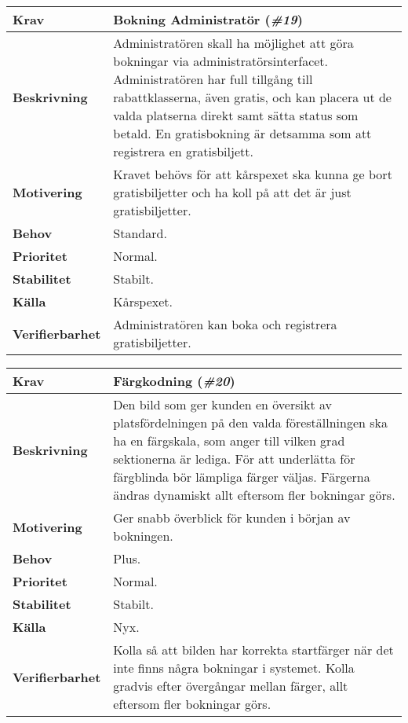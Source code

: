 \documentclass[a4paper, twoside, 11pt, titlepage]{article}
\begin{document}
		\begin{tabular} { p{2.6cm} p{12.5cm} }
			\hline
			\sffamily\textbf{Krav} & Bokning Administratör (\emph{\#19})  \\
			\hline
			\sffamily\textbf{Beskrivning} & Administratören skall ha möjlighet att göra bokningar via administratörsinterfacet. Administratören har full tillgång till rabattklasserna, även gratis, och kan placera ut de valda platserna direkt samt sätta status som betald. En gratisbokning är detsamma som att registrera en gratisbiljett.  \\
			\hline
			\sffamily\textbf{Motivering} & Kravet behövs för att kårspexet ska kunna ge bort gratisbiljetter och ha koll på att det är just gratisbiljetter.  \\
			\hline
			\sffamily\textbf{Behov} & Standard.  \\
			\hline
			\sffamily\textbf{Prioritet} & Normal.  \\
			\hline
			\sffamily\textbf{Stabilitet} & Stabilt.  \\
			\hline
			\sffamily\textbf{Källa} & Kårspexet.  \\
			\hline
			\sffamily\textbf{Verifierbarhet} & Administratören kan boka och registrera gratisbiljetter.  \\
			\hline
		\end{tabular}
		\vspace{6mm}

		\begin{tabular} { p{2.6cm} p{12.5cm} }
			\hline
			\sffamily\textbf{Krav} & Färgkodning (\emph{\#20})  \\
			\hline
			\sffamily\textbf{Beskrivning} & Den bild som ger kunden en översikt av platsfördelningen på den valda föreställningen ska ha en färgskala, som anger till vilken grad sektionerna är lediga. För att underlätta för färgblinda bör lämpliga färger väljas. Färgerna ändras dynamiskt allt eftersom fler bokningar görs.  \\
			\hline
			\sffamily\textbf{Motivering} & Ger snabb överblick för kunden i början av bokningen.  \\
			\hline
			\sffamily\textbf{Behov} & Plus.  \\
			\hline
			\sffamily\textbf{Prioritet} & Normal.  \\
			\hline
			\sffamily\textbf{Stabilitet} & Stabilt.  \\
			\hline
			\sffamily\textbf{Källa} & Nyx.  \\
			\hline
			\sffamily\textbf{Verifierbarhet} & Kolla så att bilden har korrekta startfärger när det inte finns några bokningar i systemet. Kolla gradvis efter övergångar mellan färger, allt eftersom fler bokningar görs.  \\
			\hline
		\end{tabular}
		\vspace{6mm}
\end{document}
